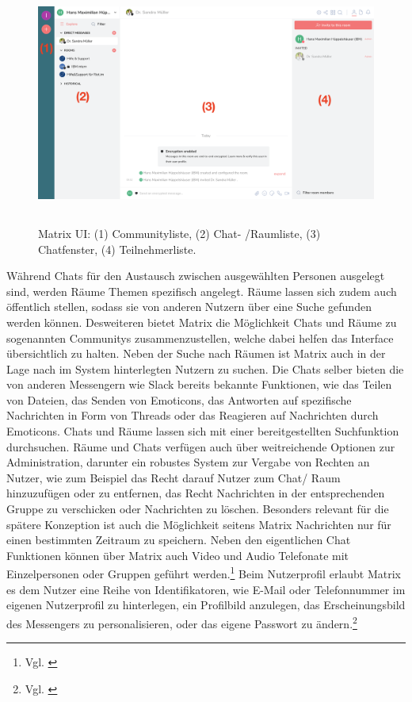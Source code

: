 \begin{figure}[htb]
    \centering
    \includegraphics[height=8cm]{graphics/unknown-3.png}
    \caption[Matrix UI]{Matrix UI: (1) Communityliste, (2) Chat- /Raumliste, (3) Chatfenster, (4) Teilnehmerliste.}
    \label{abb:UI}
\end{figure}

Während Chats für den Austausch zwischen ausgewählten Personen ausgelegt sind, werden Räume Themen spezifisch angelegt. Räume lassen sich zudem auch öffentlich stellen, sodass sie von anderen Nutzern über eine Suche gefunden werden können. Desweiteren bietet Matrix die Möglichkeit Chats und Räume zu sogenannten Communitys zusammenzustellen, welche dabei helfen das Interface übersichtlich zu halten.
Neben der Suche nach Räumen ist Matrix auch in der Lage nach im System hinterlegten Nutzern zu suchen. Die Chats selber bieten die von anderen Messengern wie Slack bereits bekannte Funktionen, wie das Teilen von Dateien, das Senden von Emoticons, das Antworten auf spezifische Nachrichten in Form von Threads oder das Reagieren auf Nachrichten durch Emoticons. Chats und Räume lassen sich mit einer bereitgestellten Suchfunktion durchsuchen. Räume und Chats verfügen auch über weitreichende Optionen zur Administration, darunter ein robustes System zur Vergabe von Rechten an Nutzer, wie zum Beispiel das Recht darauf Nutzer zum Chat/ Raum hinzuzufügen oder zu entfernen, das Recht Nachrichten in der entsprechenden Gruppe zu verschicken oder Nachrichten zu löschen. Besonders relevant für die spätere Konzeption ist auch die Möglichkeit seitens Matrix Nachrichten nur für einen bestimmten Zeitraum zu speichern.
Neben den eigentlichen Chat Funktionen können über Matrix auch Video und Audio Telefonate mit Einzelpersonen oder Gruppen geführt werden.\footnote{Vgl. \cite{Matrix.org2020}} Beim Nutzerprofil erlaubt Matrix es dem Nutzer eine Reihe von Identifikatoren, wie E-Mail oder Telefonnummer im eigenen Nutzerprofil zu hinterlegen, ein Profilbild anzulegen, das Erscheinungsbild des Messengers zu personalisieren, oder das eigene Passwort zu ändern.\footnote{Vgl. \cite{Github2020}}

